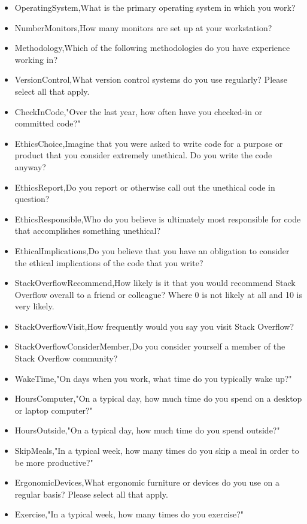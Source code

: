 \begin{appendices}
\begin{itemize}
        \item OperatingSystem,What is the primary operating system in which you work?
        \item NumberMonitors,How many monitors are set up at your workstation?
        \item Methodology,Which of the following methodologies do you have experience working in?
        \item VersionControl,What version control systems do you use regularly? Please select all that apply.
        \item CheckInCode,"Over the last year, how often have you checked-in or committed code?"
        \item EthicsChoice,Imagine that you were asked to write code for a purpose or product that you consider extremely unethical. Do you write the code anyway?
        \item EthicsReport,Do you report or otherwise call out the unethical code in question?
        \item EthicsResponsible,Who do you believe is ultimately most responsible for code that accomplishes something unethical?
        \item EthicalImplications,Do you believe that you have an obligation to consider the ethical implications of the code that you write?
        \item StackOverflowRecommend,How likely is it that you would recommend Stack Overflow overall to a friend or colleague? Where 0 is not likely at all and 10 is very likely.
        \item StackOverflowVisit,How frequently would you say you visit Stack Overflow?
        \item StackOverflowConsiderMember,Do you consider yourself a member of the Stack Overflow community?
        \item WakeTime,"On days when you work, what time do you typically wake up?"
        \item HoursComputer,"On a typical day, how much time do you spend on a desktop or laptop computer?"
        \item HoursOutside,"On a typical day, how much time do you spend outside?"
        \item SkipMeals,"In a typical week, how many times do you skip a meal in order to be more productive?"
        \item ErgonomicDevices,What ergonomic furniture or devices do you use on a regular basis? Please select all that apply.
        \item Exercise,"In a typical week, how many times do you exercise?"

\end{itemize}
\end{appendices}
